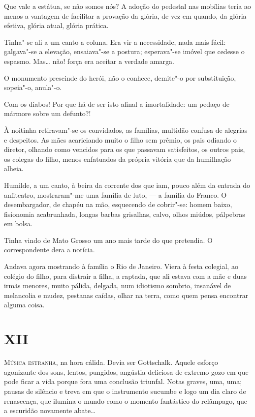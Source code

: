 Que vale a estátua, se não somos nós? A
adoção do pedestal nas mobílias teria ao menos a vantagem de facilitar
a provação da glória, de vez em quando, da glória efetiva, glória
atual, glória prática. 

Tinha"-se ali a um canto a coluna. Era vir a
necessidade, nada mais fácil: galgava"-se a elevação, ensaiava"-se a
postura; esperava"-se imóvel que cedesse o espasmo. Mas\ldots{} não! força
era aceitar a verdade amarga. 

O monumento prescinde do herói, não o
conhece, demite"-o por substituição, sopeia"-o, anula"-o. 

Com os diabos! Por que há de ser isto afinal a imortalidade: um pedaço de
mármore sobre um defunto?! 

À noitinha retiravam"-se os convidados, as
famílias, multidão confusa de alegrias e despeitos. As mães acariciando
muito o filho sem prêmio, os pais odiando o diretor, olhando como
vencidos para os que passavam satisfeitos, os outros pais, os colegas
do filho, menos enfatuados da própria vitória que da humilhação alheia.

Humilde, a um canto, à beira da corrente dos que iam, pouco além da
entrada do anfiteatro, mostraram"-me uma família de luto, --- a
família do Franco. O desembargador, de chapéu na mão, esquecendo de
cobrir"-se: homem baixo, fisionomia acabrunhada, longas barbas
grisalhas, calvo, olhos miúdos, pálpebras em bolsa. 

Tinha vindo de Mato Grosso um ano mais tarde do que pretendia. 
O correspondente dera a notícia. 

Andava agora mostrando à família o Rio de Janeiro. Viera à
festa colegial, ao colégio do filho, para distrair a filha, a raptada,
que ali estava com a mãe e duas irmãs menores, muito pálida, delgada,
num idiotismo sombrio, insanável de melancolia e mudez, pestanas
caídas, olhar na terra, como quem pensa encontrar alguma coisa. 

\section{XII}

\noindent\textsc{Música estranha}, na hora cálida. Devia ser Gottschalk. Aquele esforço
agonizante dos sons, lentos, pungidos, angústia deliciosa de extremo
gozo em que pode ficar a vida porque fora uma conclusão triunfal. Notas
graves, uma, uma; pausas de silêncio e treva em que o instrumento
sucumbe e logo um dia claro de renascença, que ilumina o mundo como o
momento fantástico do relâmpago, que a escuridão novamente abate\ldots{} 

